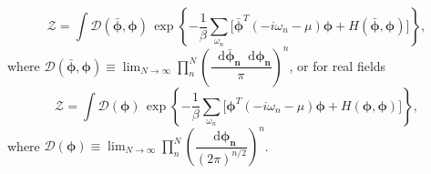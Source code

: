 \documentclass[10pt,nofootinbib]{revtex4}
\newcommand*\dd{\mathop{}\!\mathrm{d}}
\begin{document}
	\begin{equation}\label{3.6}
		\mathcal{Z}=\int\mathcal{D}(\bm{\bar\phi},\bm{\phi})\,\exp\left\{-\dfrac{1}{\beta}\sum_{\omega_n}\bigg[\bm{\bar\phi}^T(-i\omega_n-\mu)\bm{\phi}+H(\bm{\bar\phi},\bm{\phi})\bigg]\right\},
	\end{equation}
	where $\displaystyle\mathcal{D}(\bm{\bar\phi},\bm{\phi})\equiv\lim_{N\rightarrow\infty}\prod_n^N\left(\dfrac{\dd\bm{\bar\phi_n}\dd\bm{\phi_n}}{\pi}\right)^n $, or for real fields
	\begin{equation}\label{3.7}
		\mathcal{Z}=\int\mathcal{D}(\bm{\phi})\,\exp\left\{-\dfrac{1}{\beta}\sum_{\omega_n}\bigg[\bm{\phi}^T(-i\omega_n-\mu)\bm{\phi}+H(\bm{\phi},\bm{\phi})\bigg]\right\},
	\end{equation}
	where  $\displaystyle\mathcal{D}(\bm{\phi})\equiv\lim_{N\rightarrow\infty}\prod_n^N\left(\dfrac{\dd\bm{\phi_n}}{(2\pi)^{n/2}}\right)^n $.
\end{document}
